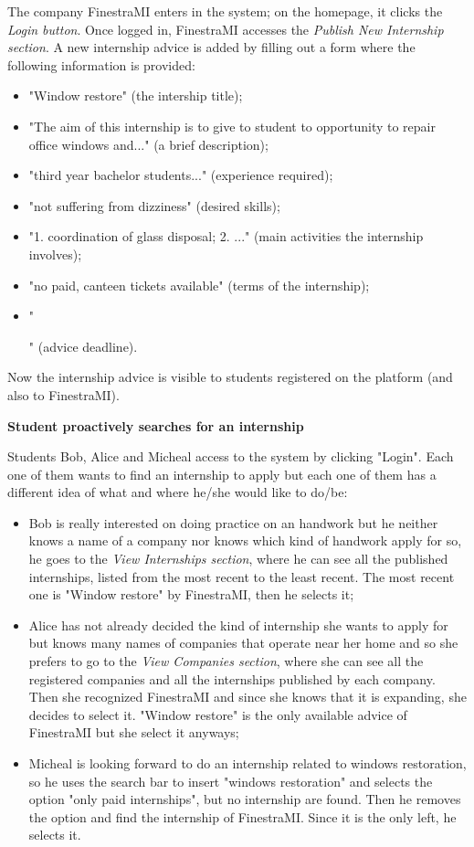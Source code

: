 			\begin{flushleft}
				The company FinestraMI enters in the system; on the homepage, it clicks the \emph{Login button}. Once logged in, FinestraMI accesses the \emph{Publish New Internship section}. A new internship advice is added by filling out a form where the following information is provided:
				\begin{itemize}
					\item "Window restore" (the intership title);
					\item "The aim of this internship is to give to student to opportunity to repair office windows and..." (a brief description);
					\item "third year bachelor students..." (experience required);
					\item "not suffering from dizziness" (desired skills);
					\item "1. coordination of glass disposal; 2. ..." (main activities the internship involves);
					\item "no paid, canteen tickets available" (terms of the internship);
					\item "\date{22/11/2024}" (advice deadline).
				\end{itemize}
				
				Now the internship advice is visible to students registered on the platform (and also to FinestraMI).
			\end{flushleft}
			\textbf{Student proactively searches for an internship}
			\begin{flushleft}
				Students Bob, Alice and Micheal access to the system by clicking "Login". Each one of them wants to find an internship to apply but each one of them has a different idea of what and where he/she would like to do/be:
				\begin{itemize}
					\item Bob is really interested on doing practice on an handwork but he neither knows a name of a company nor knows which kind of handwork apply for so, he goes to the \emph{View Internships section}, where he can see all the published internships, listed from the most recent to the least recent. The most recent one is "Window restore" by FinestraMI, then he selects it;
					\item Alice has not already decided the kind of internship she wants to apply for but knows many names of companies that operate near her home and so she prefers to go to the \emph{View Companies section}, where she can see all the registered companies and all the internships published by each company. Then she recognized FinestraMI and since she knows that it is expanding, she decides to select it. "Window restore" is the only available advice of FinestraMI but she select it anyways;
					\item Micheal is looking forward to do an internship related to windows restoration, so he uses the search bar to insert "windows restoration" and selects the option "only paid internships", but no internship are found. Then he removes the option and find the internship of FinestraMI. Since it is the only left, he selects it.
				\end{itemize} 
			\end{flushleft}

